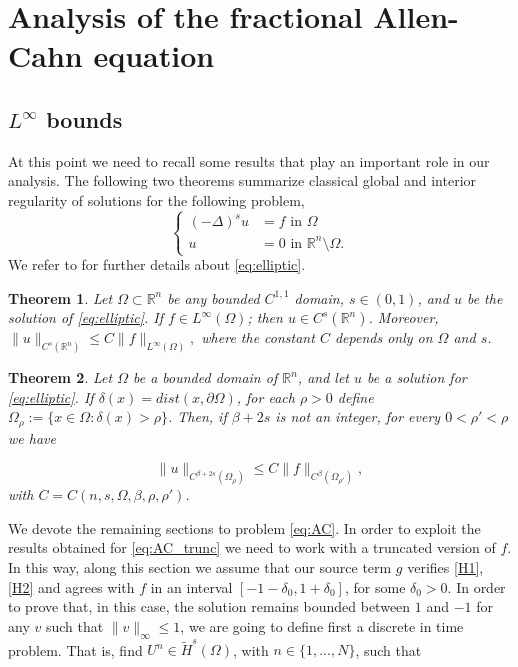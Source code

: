 \documentclass{amsart}
\newcommand{\W}{\Omega}
\newcommand{\hsT}{\widetilde{H}^s (\W)}
\newtheorem{theorem}{Theorem}[section]
\theoremstyle{remark}
\theoremstyle{definition}
\numberwithin{equation}{section}
\begin{document}
 \section{Analysis of the fractional Allen-Cahn equation} 
\label{sec:analisisAC}
\subsection{ $L^{\infty}$ bounds}
\label{sec:bounds}
At this point we need to recall some results that play an important role in our analysis.  The following two theorems summarize classical global and interior regularity of solutions for the following problem, 
\begin{equation}
\left\lbrace
  \begin{array}{rl}      
   (-\Delta)^s u  & = f  \text{ in } \Omega \\
u & =  0  \text{ in }    \mathbb{R}^n \setminus \Omega.
\end{array}
    \right.
\label{eq:elliptic}
\end{equation}
We refer to \cite{FR} for further details about \eqref{eq:elliptic}.  

\begin{theorem}
\label{teo:elliptic_reg2}
Let $\W \subset \mathbb{R}^n$ be any bounded $C^{1,1}$ domain, $s \in (0,1)$, and $u$ be the solution of \eqref{eq:elliptic}. If $f \in L^{\infty}(\W)$; then $u \in C^s(\mathbb{R}^n)$. Moreover, $\|u\|_{C^s(\mathbb{R}^n)} \leq C \|f\|_{L^{\infty}(\W)},$
where the constant $C$ depends only on $\W$ and $s$.  
\end{theorem}


\begin{theorem}
\label{teo:elliptic_reg}
Let $\W$ be a bounded domain of $\mathbb{R}^n$, and let $u$ be a solution for \eqref{eq:elliptic}. If $\delta(x)= dist(x,\partial \W)$, for each $\rho > 0$ define $\W_{\rho} := \{ x \in \W : \delta(x) > \rho \}$. Then, if $\beta + 2s$ is not an integer, for every $0<\rho'<\rho$ we have 

\begin{equation}
\label{eq:reg_est}
\|u\|_{C^{\beta + 2s}(\W_{\rho})} \leq C \| f \|_{C^{\beta}(\W_{\rho'})},
\end{equation}
with $C = C(n,s,\W,\beta,\rho,\rho')$. 


\end{theorem}

We devote the remaining sections to problem \eqref{eq:AC}. In order to exploit the results obtained for \eqref{eq:AC_trunc} we need to work with a truncated version of $f$. In this way, along this section we assume that our source term $g$ verifies 
\eqref{H1}, \eqref{H2} and agrees with $f$ in an interval  $[-1 - \delta_0 , 1 + \delta_0]$, for some $\delta_0>0$. In order to prove that, in this case, the solution remains bounded between $1$ and $-1$ for any $v$ such that $\|v\|_{\infty}\le 1$, we are going to define first a discrete in time problem. That is, find $U^n \in \hsT$, with $n \in \{1,...,N\}$, such that 
\end{document}

